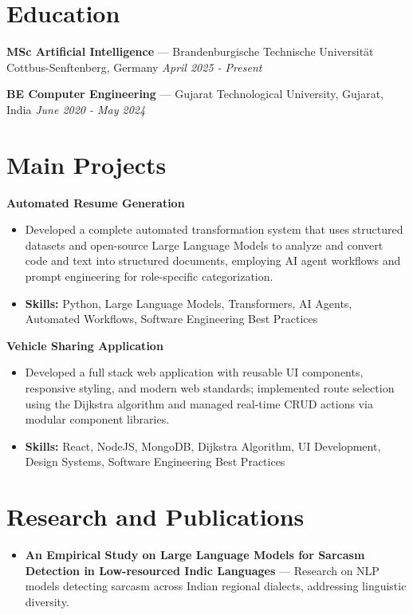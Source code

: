 \documentclass[a4paper,10pt]{article}
\begin{document}
\section*{Education}
\textbf{MSc Artificial Intelligence} — Brandenburgische Technische Universität Cottbus-Senftenberg, Germany \hfill \textit{April 2025 - Present}\par
\vspace{1.5pt}
\textbf{BE Computer Engineering} — Gujarat Technological University, Gujarat, India \hfill \textit{June 2020 - May 2024}\par

\section*{Main Projects}
\textbf{Automated Resume Generation}\par
\vspace{1pt}
\begin{itemize}
  \item Developed a complete automated transformation system that uses structured datasets and open-source Large Language Models to analyze and convert code and text into structured documents, employing AI agent workflows and prompt engineering for role-specific categorization.
  \item \textbf{Skills:} Python, Large Language Models, Transformers, AI Agents, Automated Workflows, Software Engineering Best Practices
\end{itemize}
\vspace{3pt}
\textbf{Vehicle Sharing Application}\par
\vspace{1pt}
\begin{itemize}
  \item Developed a full stack web application with reusable UI components, responsive styling, and modern web standards; implemented route selection using the Dijkstra algorithm and managed real-time CRUD actions via modular component libraries.
  \item \textbf{Skills:} React, NodeJS, MongoDB, Dijkstra Algorithm, UI Development, Design Systems, Software Engineering Best Practices
\end{itemize}

\section*{Research and Publications}
\begin{itemize}
\item \textbf{An Empirical Study on Large Language Models for Sarcasm Detection in Low-resourced Indic Languages} — Research on NLP models detecting sarcasm across Indian regional dialects, addressing linguistic diversity.
\end{itemize}
\end{document}
